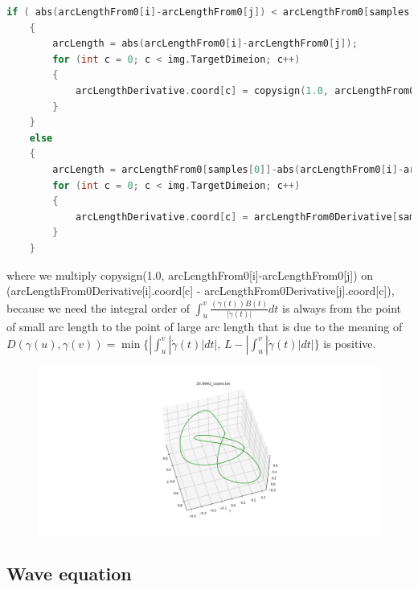 \documentclass[12pt]{article}
\begin{document}
\begin{lstlisting}[language=c++]
	if ( abs(arcLengthFrom0[i]-arcLengthFrom0[j]) < arcLengthFrom0[samples[0]]-abs(arcLengthFrom0[i]-arcLengthFrom0[j]) )
	{
		arcLength = abs(arcLengthFrom0[i]-arcLengthFrom0[j]);
		for (int c = 0; c < img.TargetDimeion; c++)
		{
			arcLengthDerivative.coord[c] = copysign(1.0, arcLengthFrom0[i]-arcLengthFrom0[j]) * (arcLengthFrom0Derivative[i].coord[c] - arcLengthFrom0Derivative[j].coord[c]);
		}
	}
	else
	{
		arcLength = arcLengthFrom0[samples[0]]-abs(arcLengthFrom0[i]-arcLengthFrom0[j]);
		for (int c = 0; c < img.TargetDimeion; c++)
		{
			arcLengthDerivative.coord[c] = arcLengthFrom0Derivative[samples[0]].coord[c] - copysign(1.0, arcLengthFrom0[i]-arcLengthFrom0[j])*(arcLengthFrom0Derivative[i].coord[c] - arcLengthFrom0Derivative[j].coord[c]);
		}
	}
\end{lstlisting}
%
where we multiply \textsf{copysign(1.0, arcLengthFrom0[i]-arcLengthFrom0[j])} on \textsf{(arcLengthFrom0Derivative[i].coord[c] - arcLengthFrom0Derivative[j].coord[c])}, because we need the integral order of $\int_u^v\frac{(\dot{\gamma}(t))\dot{B}(t)}{|\dot{\gamma}(t)|}dt$ is always from the point of small arc length to the point of large arc length that is due to the meaning of $D(\gamma (u),\gamma (v)) = \min\{ |\int_u^v |\dot{\gamma}(t)|dt|,\, L - |\int_u^v |\dot{\gamma}(t)|dt| \}$ is positive.


\begin{figure}[H]
	\centering
	\includegraphics[width=1.0\linewidth]{../knot_energy/data/knot_energy_ex.png}
\end{figure}





\subsection{Wave equation}
\end{document}
